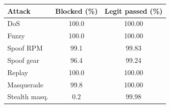\begin{tabular}{@{}lcc@{}}
\toprule
Attack & Blocked (\%) & Legit passed (\%)\\
\midrule
DoS & 100.0 & 100.00\\
Fuzzy & 100.0 & 100.00\\
Spoof RPM & 99.1 & 99.83\\
Spoof gear & 96.4 & 99.24\\
Replay & 100.0 & 100.00\\
Masquerade & 99.8 & 100.00\\
Stealth masq. & 0.2 & 99.98\\
\bottomrule
\end{tabular}
